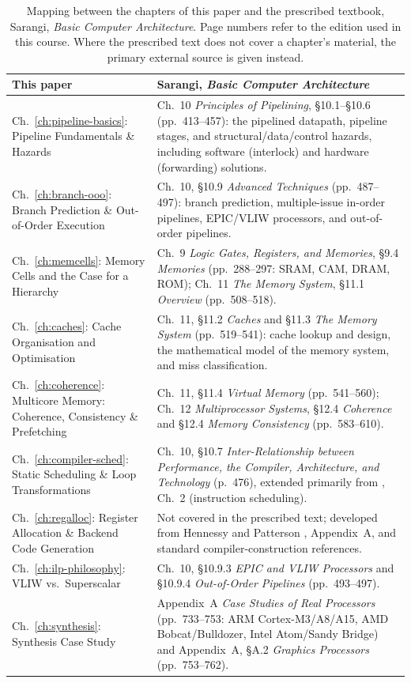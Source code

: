 \documentclass[12pt,a4paper]{report}
\begin{document}
\begin{table}[htbp]
\centering
\caption{Mapping between the chapters of this paper and the prescribed
textbook, Sarangi, \emph{Basic Computer Architecture}. Page numbers refer
to the edition used in this course. Where the prescribed text does not
cover a chapter's material, the primary external source is given instead.}
\label{tab:textbook-map}
\begin{tabular}{@{}L{0.40\textwidth}L{0.52\textwidth}@{}}
\toprule
\textbf{This paper} & \textbf{Sarangi, \emph{Basic Computer Architecture}} \\
\midrule
Ch.~\ref{ch:pipeline-basics}: Pipeline Fundamentals \& Hazards &
  Ch.~10 \emph{Principles of Pipelining}, \S10.1--\S10.6 (pp.~413--457):
  the pipelined datapath, pipeline stages, and structural/data/control
  hazards, including software (interlock) and hardware (forwarding)
  solutions. \\
Ch.~\ref{ch:branch-ooo}: Branch Prediction \& Out-of-Order Execution &
  Ch.~10, \S10.9 \emph{Advanced Techniques} (pp.~487--497): branch
  prediction, multiple-issue in-order pipelines, EPIC/VLIW processors,
  and out-of-order pipelines. \\
Ch.~\ref{ch:memcells}: Memory Cells and the Case for a Hierarchy &
  Ch.~9 \emph{Logic Gates, Registers, and Memories}, \S9.4 \emph{Memories}
  (pp.~288--297: SRAM, CAM, DRAM, ROM); Ch.~11 \emph{The Memory System},
  \S11.1 \emph{Overview} (pp.~508--518). \\
Ch.~\ref{ch:caches}: Cache Organisation and Optimisation &
  Ch.~11, \S11.2 \emph{Caches} and \S11.3 \emph{The Memory System}
  (pp.~519--541): cache lookup and design, the mathematical model of the
  memory system, and miss classification. \\
Ch.~\ref{ch:coherence}: Multicore Memory: Coherence, Consistency \&
  Prefetching &
  Ch.~11, \S11.4 \emph{Virtual Memory} (pp.~541--560); Ch.~12
  \emph{Multiprocessor Systems}, \S12.4 \emph{Coherence} and
  \S12.4 \emph{Memory Consistency} (pp.~583--610). \\
Ch.~\ref{ch:compiler-sched}: Static Scheduling \& Loop Transformations &
  Ch.~10, \S10.7 \emph{Inter-Relationship between Performance, the
  Compiler, Architecture, and Technology} (p.~476), extended primarily
  from \cite{shen}, Ch.~2 (instruction scheduling). \\
Ch.~\ref{ch:regalloc}: Register Allocation \& Backend Code Generation &
  Not covered in the prescribed text; developed from Hennessy and
  Patterson \cite{hennessy}, Appendix~A, and standard compiler-construction
  references. \\
Ch.~\ref{ch:ilp-philosophy}: VLIW vs.\ Superscalar &
  Ch.~10, \S10.9.3 \emph{EPIC and VLIW Processors} and \S10.9.4
  \emph{Out-of-Order Pipelines} (pp.~493--497). \\
Ch.~\ref{ch:synthesis}: Synthesis Case Study &
  Appendix~A \emph{Case Studies of Real Processors} (pp.~733--753: ARM
  Cortex-M3/A8/A15, AMD Bobcat/Bulldozer, Intel Atom/Sandy Bridge) and
  Appendix~A, \S A.2 \emph{Graphics Processors} (pp.~753--762). \\
\bottomrule
\end{tabular}
\end{table}
\end{document}
